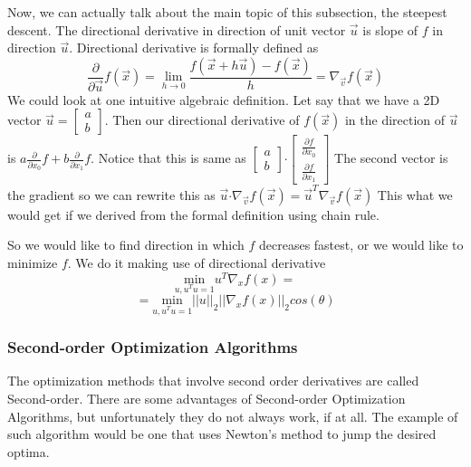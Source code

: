 \documentclass[paper=a4, fontsize=11pt]{scrartcl}
\numberwithin{equation}{section}		%
\numberwithin{figure}{section}			%
\numberwithin{table}{section}			%
\begin{document}
 Now, we can actually talk about the main topic of this subsection, the steepest descent. The directional derivative in direction of unit vector $\vec{u}$ is slope of $f$ in direction $\vec{u}$. Directional derivative is formally defined as $$ \frac{\partial}{\partial \vec{u}} f(\vec{x}) = \lim_{h\to0} \frac{f(\vec{x} + h\vec{u}) - f(\vec{x})}{h} = \nabla_{\vec{v}} f(\vec{x})$$
We could look at one intuitive algebraic definition. Let say that we have a 2D vector $\vec{u} = \begin{bmatrix} a \\ b \end{bmatrix}$. Then our directional derivative of $f(\vec{x})$ in the direction of $\vec{u}$ is $a\frac{\partial}{\partial x_0}f + b\frac{\partial}{\partial x_1}f$. Notice that this is same as $\begin{bmatrix} a \\ b \end{bmatrix} \boldsymbol{\cdot} \begin{bmatrix} \frac{\partial f}{\partial x_0} \\  \frac{\partial f}{\partial x_1} \end{bmatrix} $ The second vector is the gradient so we can rewrite this as $\vec{u} \boldsymbol{\cdot} \nabla_{\vec{v}} f(\vec{x}) = \vec{u}^T \nabla_{\vec{v}} f(\vec{x}) $ This what we would get if we derived from the formal definition using chain rule.  \par
So we would like to find direction in which $f$ decreases fastest, or we would like to minimize $f$. We do it making use of directional derivative 
$$\underset{u,u^Tu=1}{\text{min}} u^T\nabla_x f(x) =$$
$$ = \underset{u,u^Tu=1}{\text{min}} ||u||_2||\nabla_x f(x)||_2cos(\theta) $$


	\subsubsection{Second-order Optimization Algorithms}
	The optimization methods that involve second order derivatives are called Second-order. There are some advantages of Second-order Optimization Algorithms, but unfortunately they do not always work, if at all. The example of such algorithm would be one that uses Newton's method to jump the desired optima. 
\end{document}
